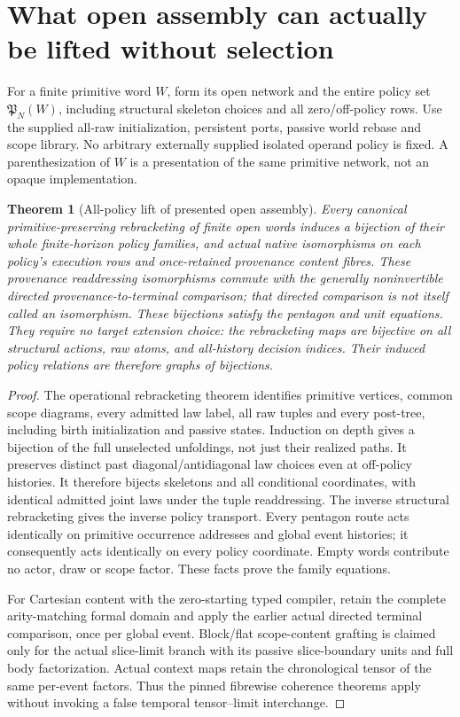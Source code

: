 \documentclass[11pt]{article}
\newtheorem{theorem}{Theorem}\newtheorem{proposition}[theorem]{Proposition}
\begin{document}
\section{What open assembly can actually be lifted without selection}
For a finite primitive word $W$, form its open network and the entire policy set $\mathfrak P_N(W)$, including structural skeleton choices and all zero/off-policy rows. Use the supplied all-raw initialization, persistent ports, passive world rebase and scope library. No arbitrary externally supplied isolated operand policy is fixed. A parenthesization of $W$ is a presentation of the same primitive network, not an opaque implementation.

\begin{theorem}[All-policy lift of presented open assembly]
Every canonical primitive-preserving rebracketing of finite open words induces a bijection of their whole finite-horizon policy families, and actual native isomorphisms on each policy's execution rows and once-retained provenance content fibres. These provenance readdressing isomorphisms commute with the generally noninvertible directed provenance-to-terminal comparison; that directed comparison is not itself called an isomorphism. These bijections satisfy the pentagon and unit equations. They require no target extension choice: the rebracketing maps are bijective on all structural actions, raw atoms, and all-history decision indices. Their induced policy relations are therefore graphs of bijections.
\end{theorem}
\begin{proof}
The operational rebracketing theorem identifies primitive vertices, common scope diagrams, every admitted law label, all raw tuples and every post-tree, including birth initialization and passive states. Induction on depth gives a bijection of the full unselected unfoldings, not just their realized paths. It preserves distinct past diagonal/antidiagonal law choices even at off-policy histories. It therefore bijects skeletons and all conditional coordinates, with identical admitted joint laws under the tuple readdressing. The inverse structural rebracketing gives the inverse policy transport. Every pentagon route acts identically on primitive occurrence addresses and global event histories; it consequently acts identically on every policy coordinate. Empty words contribute no actor, draw or scope factor. These facts prove the family equations.

For Cartesian content with the zero-starting typed compiler, retain the complete arity-matching formal domain and apply the earlier actual directed terminal comparison, once per global event. Block/flat scope-content grafting is claimed only for the actual slice-limit branch with its passive slice-boundary units and full body factorization. Actual context maps retain the chronological tensor of the same per-event factors. Thus the pinned fibrewise coherence theorems apply without invoking a false temporal tensor--limit interchange.\end{proof}
\end{document}
